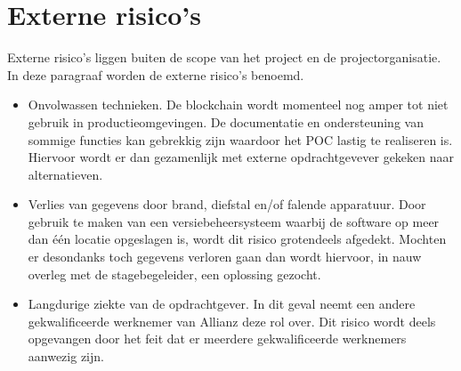 \section{Externe risico's}
Externe risico's liggen buiten de scope van het project en de projectorganisatie. In deze paragraaf worden de externe risico's benoemd.\par
\begin{itemize}
\item Onvolwassen technieken. De blockchain wordt momenteel nog amper tot niet gebruik in productieomgevingen. De documentatie en ondersteuning van sommige functies kan gebrekkig zijn waardoor het POC lastig te realiseren is. Hiervoor wordt er dan gezamenlijk met externe opdrachtgevever gekeken naar alternatieven.
\item Verlies van gegevens door brand, diefstal en/of falende apparatuur. Door gebruik te maken van een versiebeheersysteem waarbij de software op meer dan één locatie opgeslagen is, wordt dit risico grotendeels afgedekt. Mochten er desondanks toch gegevens verloren gaan dan wordt hiervoor, in nauw overleg met de stagebegeleider, een oplossing gezocht.
\item Langdurige ziekte van de opdrachtgever. In dit geval neemt een andere gekwalificeerde werknemer van Allianz deze rol over. Dit risico wordt deels opgevangen door het feit dat er meerdere gekwalificeerde werknemers aanwezig zijn.
\end{itemize}
